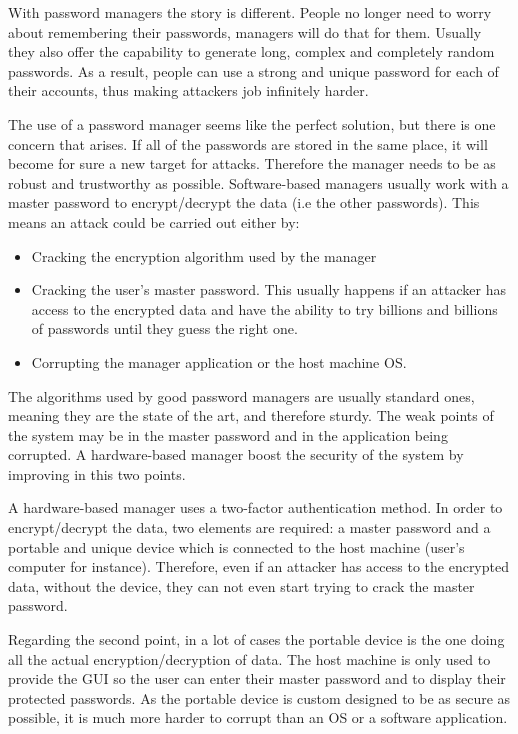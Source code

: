 With password managers the story is different. People no longer need to worry about remembering their passwords, managers will do that for them. Usually they also offer the capability to generate long, complex and completely random passwords. As a result, people can use a strong and unique password for each of their accounts, thus making attackers job infinitely harder.

\vspace{15pt}

The use of a password manager seems like the perfect solution, but there is one concern that arises. If all of the passwords are stored in the same place, it will become for sure a new target for attacks. Therefore the manager needs to be as robust and trustworthy as possible. Software-based managers usually work with a master password to encrypt/decrypt the data (i.e the other passwords). This means an attack could be carried out either by:
\begin{itemize}
\setlength\itemsep{-3pt}
\item Cracking the encryption algorithm used by the manager
\item Cracking the user's master password. This usually happens if an attacker has access to the encrypted data and have the ability to try billions and billions of passwords until they guess the right one.
\item Corrupting the manager application or the host machine OS.
\end{itemize}

The algorithms used by good password managers are usually standard ones, meaning they are the state of the art, and therefore sturdy. The weak points of the system may be in the master password and in the application being corrupted. A hardware-based manager boost the security of the system by improving in this two points. 

A hardware-based manager uses a two-factor authentication method. In order to encrypt/decrypt the data, two elements are required: a master password and a portable and unique device which is connected to the host machine (user's computer for instance). Therefore, even if an attacker has access to the encrypted data, without the device, they can not even start trying to crack the master password. 

Regarding the second point, in a lot of cases the portable device is the one doing all the actual encryption/decryption of data. The host machine is only used to provide the GUI so the user can enter their master password and to display their protected passwords. As the portable device is custom designed to be as secure as possible, it is much more harder to corrupt than an OS or a software application.

